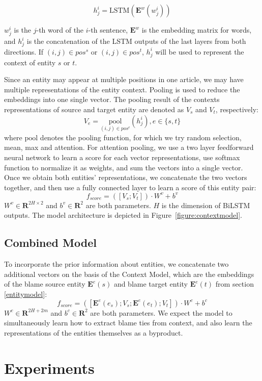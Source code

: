 \documentclass[letterpaper]{article}
\begin{document}
$$h^i_j=\mathrm{LSTM}(\mathbf{E}^w(w^i_j))$$

$w^i_j$ is the $j$-th word of the $i$-th sentence, $\mathbf{E}^w$ is the embedding matrix for words, and $h^i_j$ is the concatenation of the LSTM outputs of the last layers from both directions. If $(i, j) \in pos^s$ or $(i, j) \in pos^t$, $h^i_j$ will be used to represent the context of entity $s$ or $t$.

Since an entity may appear at multiple positions in one article, we may have multiple representations of the entity context. Pooling is used to reduce the embeddings into one single vector. The pooling result of the contexts representations of source and target entity are denoted as $V_s$ and $V_t$, respectively: $$V_e = \underset{(i, j) \in pos^e} {\mathrm{pool}} (h^i_j), e \in \{s, t\}$$where $\mathrm{pool}$ denotes the pooling function, for which we try random selection, mean, max and attention. For attention pooling, we use a two layer feedforward neural network to learn a score for each vector representations, use softmax function to normalize it as weights, and sum the vectors into a single vector. Once we obtain both entities' representations, we concatenate the two vectors together, and then use a fully connected layer to learn a score of this entity pair: $$f_{score} = ([V_s; V_t]) \cdot W^v + b^v $$ $W^v \in \mathbf{R}^{2H \times 2}$ and $b^v \in \mathbf{R}^{2}$ are both parameters. $H$ is the dimension of BiLSTM outputs. The model architecture is depicted in Figure~\ref{figure:contextmodel}.

\subsection{Combined Model}

To incorporate the prior information about entities, we concatenate two additional vectors on the basis of the Context Model, which are the embeddings of the blame source entity $\mathbf{E}^e(s)$ and blame target entity $\mathbf{E}^e(t)$ from section \ref{entitymodel}: $$f_{score} = ([\mathbf{E}^e(e_s); V_s; \mathbf{E}^e(e_t); V_t]) \cdot W^c + b^c $$ $W^c \in \mathbf{R}^{2H + 2m}$ and $b^c \in \mathbf{R}^{2}$ are both parameters. We expect the model to simultaneously learn how to extract blame ties from context, and also learn the representations of the entities themselves as a byproduct.

\section{Experiments}
\label{experiment}
\end{document}
